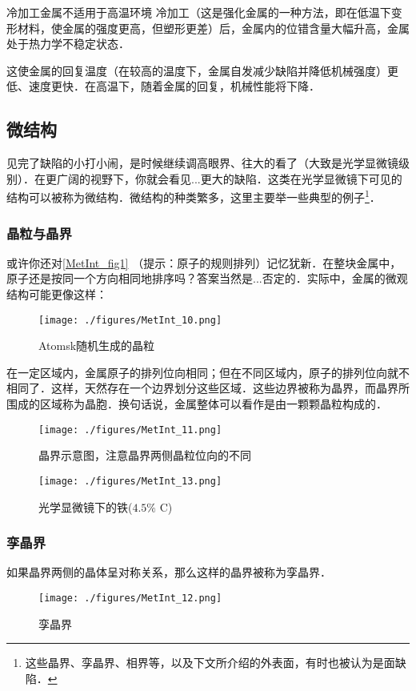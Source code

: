 \begin{example}{冷加工金属不适用于高温环境}
冷加工（这是强化金属的一种方法，即在低温下变形材料，使金属的强度更高，但塑形更差）后，金属内的位错含量大幅升高，金属处于热力学不稳定状态．

这使金属的回复温度（在较高的温度下，金属自发减少缺陷并降低机械强度）更低、速度更快．在高温下，随着金属的回复，机械性能将下降．
\end{example}

\subsection{微结构}
见完了缺陷的小打小闹，是时候继续调高眼界、往大的看了（大致是光学显微镜级别）．在更广阔的视野下，你就会看见...更大的缺陷．这类在光学显微镜下可见的结构可以被称为微结构．微结构的种类繁多，这里主要举一些典型的例子\footnote{这些晶界、孪晶界、相界等，以及下文所介绍的外表面，有时也被认为是面缺陷．}．

\subsubsection{晶粒与晶界}
或许你还对\autoref{MetInt_fig1} （提示：原子的规则排列）记忆犹新．在整块金属中，原子还是按同一个方向相同地排序吗？答案当然是...否定的．实际中，金属的微观结构可能更像这样：
\begin{figure}[ht]
\centering
\texttt{[image: ./figures/MetInt\_10.png]}
\caption{Atomsk随机生成的晶粒} \label{MetInt_fig10}
\end{figure}
在一定区域内，金属原子的排列位向相同；但在不同区域内，原子的排列位向就不相同了．这样，天然存在一个边界划分这些区域．这些边界被称为晶界，而晶界所围成的区域称为晶胞．换句话说，金属整体可以看作是由一颗颗晶粒构成的．
\begin{figure}[ht]
\centering
\texttt{[image: ./figures/MetInt\_11.png]}
\caption{晶界示意图，注意晶界两侧晶粒位向的不同} \label{MetInt_fig11}
\end{figure}

\begin{figure}[ht]
\centering
\texttt{[image: ./figures/MetInt\_13.png]}
\caption{光学显微镜下的铁($4.5\%$ C)} \label{MetInt_fig13}
\end{figure}

\subsubsection{孪晶界}
如果晶界两侧的晶体呈对称关系，那么这样的晶界被称为孪晶界．
\begin{figure}[ht]
\centering
\texttt{[image: ./figures/MetInt\_12.png]}
\caption{孪晶界} \label{MetInt_fig12}
\end{figure}

